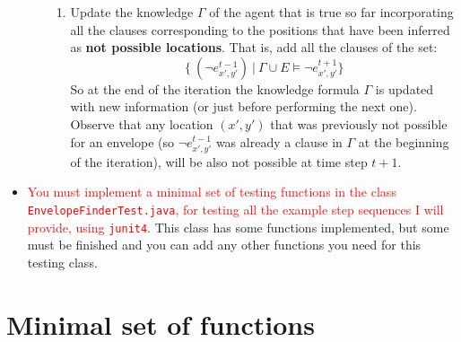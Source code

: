 \documentclass{tufte-handout}
\begin{document}
\begin{fullwidth}
\begin{itemize}
\begin{enumerate}
\begin{enumerate}
\item Update the knowledge $ \Gamma $ of the agent that
is true so far  incorporating
all the clauses corresponding to the positions that have been
 inferred as \textbf{ not possible locations}. That is, add all the
clauses of the set:
$$
 \{ \ (\neg e_{x',y'}^{t-1}) \ | \ \Gamma \cup E
    \models \neg  e_{x',y'}^{t+1} \} $$
So at the end of the iteration the knowledge formula $\Gamma$ is
updated with new information (or just before performing the next one).
Observe that any location $(x',y')$ that was previously not possible for an envelope
(so $ \neg e_{x',y'}^{t-1} $ was already a clause in $\Gamma$ at the beginning of
the iteration), will be also not possible at time step $t+1$.
\end{enumerate}
\end{enumerate}
\item  \textcolor{red}{You must implement a minimal set of testing functions in the class
{\tt EnvelopeFinderTest.java}, for testing all the example step sequences I will provide,
 using {\tt junit4}}. This class has some functions
implemented, but some must be finished and you can add any other functions you need for this
testing class.
\end{itemize}
\end{fullwidth}

\section{Minimal set of functions}
\end{document}
